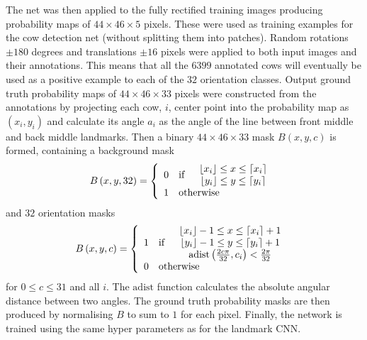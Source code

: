 \documentclass{cta-author}
\begin{document}
 The net was then applied to the fully rectified training images producing probability maps of $44\times
46\times 5$ pixels. These were used as training examples for the cow detection net (without splitting them
into patches). Random rotations $\pm 180$ degrees and translations $\pm 16$ pixels were applied to both
input images and their annotations. This means that all the $6399$ annotated cows will eventually be used as
a positive example to each of the $32$ orientation classes. Output ground truth probability maps of $44\times
46\times 33$ pixels were constructed from the annotations by projecting each cow, $i$, center point into the
probability map as $\left( x_i, y_i \right)$ and calculate its angle $a_i$ as the angle of the line between
front middle and back middle landmarks. Then a binary $44\times 46\times 33$ mask $B\left( x, y, c \right)$
is formed, containing a background mask
\begin{equation}
B\left( x, y, 32 \right) = \left\lbrace
\begin{array}{clc}
0 & \text{if} &
\begin{array}{c}
 \lfloor x_i \rfloor \leq x \leq \lceil x_i \rceil \\
 \lfloor y_i \rfloor \leq y \leq \lceil y_i \rceil
\end{array}
\\
1 & \multicolumn{2}{l}{\text{otherwise}}
\end{array}
\right.
\end{equation}
and $32$ orientation masks
\begin{equation}
B\left( x, y, c \right) = \left\lbrace
\begin{array}{clc}
1 & \text{if} &
\begin{array}{c}
 \lfloor x_i \rfloor-1 \leq x \leq \lceil x_i \rceil+1 \\
 \lfloor y_i \rfloor-1 \leq y \leq \lceil y_i \rceil+1 \\
 \mathrm{adist}\left(\frac{2c\pi}{32}, c_i\right) < \frac{2\pi}{32} \\
\end{array}
\\
0 & \multicolumn{2}{l}{\text{otherwise}}
\end{array}
\right.
\end{equation}
for $0\leq c \leq 31$ and all $i$. The $\mathrm{adist}$ function calculates the absolute angular distance
between two angles. The ground truth probability masks are then produced by normalising $B$ to sum to $1$ for
each pixel. Finally, the network is trained using the same hyper parameters as for the landmark CNN.
\end{document}
